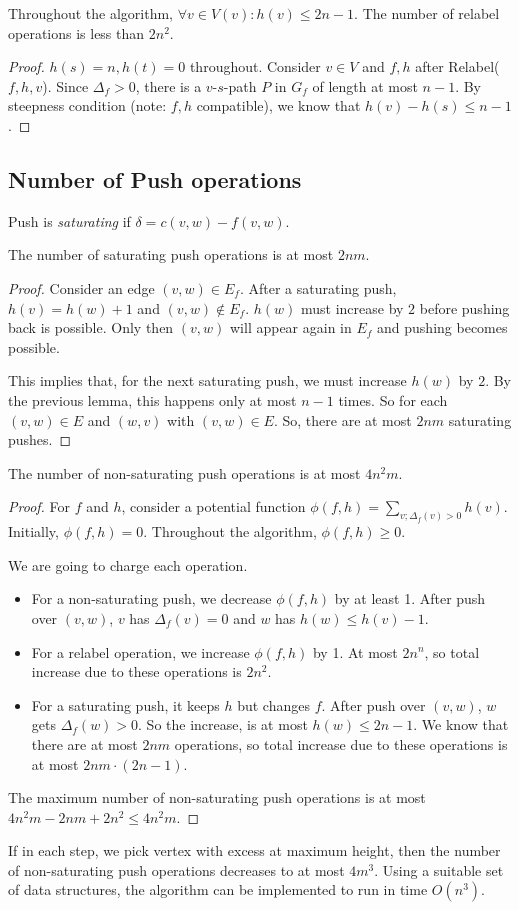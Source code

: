 \begin{mylemma}
Throughout the algorithm, $\forall v \in V(v): h(v) \le 2n -1$. The number of relabel operations is less than $2n^2$.
\end{mylemma}
\begin{proof}
$h(s) = n, h(t) = 0$ throughout. Consider $v \in V$ and $f,h$ after Relabel($f,h,v$).
Since $\Delta_f > 0$, there is a $v$-$s$-path $P$ in $G_f$ of length at most $n-1$.
By steepness condition (note: $f,h$ compatible), we know that $h(v) - h(s) \le n-1$. 
\end{proof}

\subsection{Number of Push operations}

Push is \emph{saturating} if $\delta = c(v,w) - f(v,w)$.

\begin{mylemma}
The number of saturating push operations is at most $2nm$.
\end{mylemma}
\begin{proof}
Consider an edge $(v,w) \in E_f$. After a saturating push, $h(v) = h(w) + 1$ and $(v,w) \notin E_f$. $h(w)$ must increase by $2$ before pushing back is possible. Only then $(v,w)$ will appear again in $E_f$ and pushing becomes possible.

This implies that, for the next saturating push, we must increase $h(w)$ by $2$. By the previous lemma, this happens only at most $n-1$ times. So for each $(v,w) \in E$ and $(w,v)$ with $(v,w) \in E$. So, there are at most $2nm$ saturating pushes.
\end{proof}

\begin{mylemma}
The number of non-saturating push operations is at most $4n^2 m$.
\end{mylemma}
\begin{proof}
For $f$ and $h$, consider a potential function $\phi(f,h) = \sum_{v; \Delta_f(v) > 0} h(v)$. Initially, $\phi(f,h) = 0$. Throughout the algorithm, $\phi(f,h) \ge 0$.

We are going to charge each operation.

\begin{itemize}
\item For a non-saturating push, we decrease $\phi(f,h)$ by at least 1. After push over $(v,w)$, $v$ has $\Delta_f(v) = 0$ and $w$ has $h(w) \le h(v) - 1$.
\item For a relabel operation, we increase $\phi(f,h)$ by 1. At most $2n^n$, so total increase due to these operations is $2n^2$.
\item For a saturating push, it keeps $h$ but changes $f$. After push over $(v,w)$, $w$ gets $\Delta_f(w) > 0$. So the increase, is at most $h(w) \le 2n-1$. We know that there are at most $2nm$ operations, so total increase due to these operations is at most $2nm \cdot (2n-1)$. 
\end{itemize}

The maximum number of non-saturating push operations is at most $4n^2m - 2nm + 2n^2 \le 4n^2 m$. \end{proof}

If in each step, we pick vertex with excess at maximum height, then the number of non-saturating push operations decreases to at most $4m^3$. Using a suitable set of data structures, the algorithm can be implemented to run in time $O(n^3)$.



